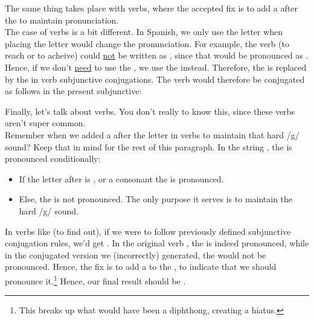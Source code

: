 The same thing takes place with  verbs, where the accepted fix is to add a  after the  to maintain pronunciation.\\ 

The case of  verbs is a bit different. In Spanish, we only use the letter  when placing the letter  would change the pronunciation. For example, the verb  (to reach or to acheive) could \underline{not} be written as \sout{}, since that would be pronounced as . Hence, if we don't \underline{need} to use the , we use the  instead. Therefore, the  is replaced by the  in  verb subjunctive conjugations. The verb  would therefore be conjugated as follows in the present subjunctive:\\





Finally, let's talk about  verbs. You don't really  to know this, since these verbs aren't super common.\\

Remember when we added a  after the letter  in  verbs to maintain that hard /g/ sound? Keep that in mind for the rest of this paragraph. In the string , the  is pronounced conditionally:

\begin{itemize}[noitemsep]
	\item If the letter after  is , or a consonant the  is pronounced. 
	\item Else, the  is not pronounced. The only purpose it serves is to maintain the hard /g/ sound. 
\end{itemize}

In verbs like  (to find out), if we were to follow previously defined subjunctive conjugation rules, we'd get \sout{}. In the original verb , the  is indeed pronounced, while in the conjugated version we (incorrectly) generated, the  would not be pronounced. Hence, the fix is to add a  to the , to indicate that we should pronounce it.\footnote{This breaks up what would have been a diphthong, creating a hiatus.} Hence, our final result should be .

